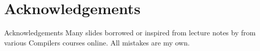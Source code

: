 
\section*{Acknowledgements}

\begin{frame}
\centering
\begin{alertblock}{Acknowledgements}
Many slides borrowed or inspired from lecture notes by from various Compilers courses online.
\bigskip
All mistakes are my own.
\end{alertblock}
\end{frame}

